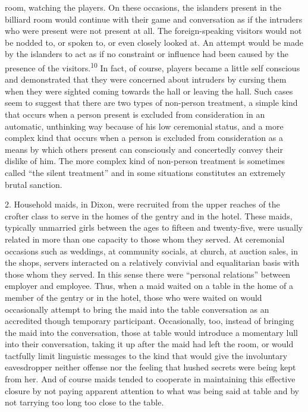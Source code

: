 \documentclass[twoside,symmetric,nobib,justified]{tufte-book}
\begin{document}
room, watching the players. On these occasions, the islanders present in
the billiard room would continue with their game and conversation as if
the intruders who were present were not present at all. The
foreign-speaking visitors would not be nodded to, or spoken to, or even
closely looked at. An attempt would be made by the islanders to act as
if no constraint or influence had been caused by the presence of the
visitors.\textsuperscript{10} In fact, of course,
players became a little self conscious and demonstrated that they were
concerned about intruders by cursing them when they were sighted coming
towards the hall or leaving the hall. Such cases seem to suggest that
there are two types of non-person treatment, a simple kind that occurs
when a person present is excluded from consideration in an automatic,
unthinking way because of his low ceremonial status, and a more complex
kind that occurs when a person is excluded from consideration as a means
by which others present can consciously and concertedly convey their
dislike of him. The more complex kind of non-person treatment is
sometimes called ``the silent treatment'' and in some situations
constitutes an extremely brutal sanction.

2. Household maids, in Dixon, were recruited from the upper reaches of
the crofter class to serve in the homes of the gentry and in the hotel.
These maids, typically unmarried girls between the ages to fifteen and
twenty-five, were usually related in more than one capacity to those
whom they served. At ceremonial occasions such as weddings, at community
socials, at church, at auction sales, in the shops, servers interacted
on a relatively convivial and equalitarian basis with those whom they
served. In this sense there were ``personal relations'' between employer
and employee. Thus, when a maid waited on a table in the home of a
member of the gentry or in the hotel, those who were waited on would
occasionally attempt to bring the maid into the table conversation as an
accredited though temporary participant. Occasionally, too, instead of
bringing the maid into the conversation, those at table would introduce
a momentary lull into their conversation, taking it up after the maid
had left the room, or would tactfully limit linguistic messages to the
kind that would give the involuntary eavesdropper neither offense nor
the feeling that hushed secrets were being kept from her. And of course
maids tended to cooperate in maintaining this effective closure by not
paying apparent attention to what was being said at table and by not
tarrying too long too close to the table.
\end{document}
